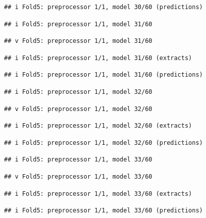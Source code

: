 \documentclass[
]{article}
\begin{document}
\begin{verbatim}
## i Fold5: preprocessor 1/1, model 30/60 (predictions)
\end{verbatim}

\begin{verbatim}
## i Fold5: preprocessor 1/1, model 31/60
\end{verbatim}

\begin{verbatim}
## v Fold5: preprocessor 1/1, model 31/60
\end{verbatim}

\begin{verbatim}
## i Fold5: preprocessor 1/1, model 31/60 (extracts)
\end{verbatim}

\begin{verbatim}
## i Fold5: preprocessor 1/1, model 31/60 (predictions)
\end{verbatim}

\begin{verbatim}
## i Fold5: preprocessor 1/1, model 32/60
\end{verbatim}

\begin{verbatim}
## v Fold5: preprocessor 1/1, model 32/60
\end{verbatim}

\begin{verbatim}
## i Fold5: preprocessor 1/1, model 32/60 (extracts)
\end{verbatim}

\begin{verbatim}
## i Fold5: preprocessor 1/1, model 32/60 (predictions)
\end{verbatim}

\begin{verbatim}
## i Fold5: preprocessor 1/1, model 33/60
\end{verbatim}

\begin{verbatim}
## v Fold5: preprocessor 1/1, model 33/60
\end{verbatim}

\begin{verbatim}
## i Fold5: preprocessor 1/1, model 33/60 (extracts)
\end{verbatim}

\begin{verbatim}
## i Fold5: preprocessor 1/1, model 33/60 (predictions)
\end{verbatim}
\end{document}
